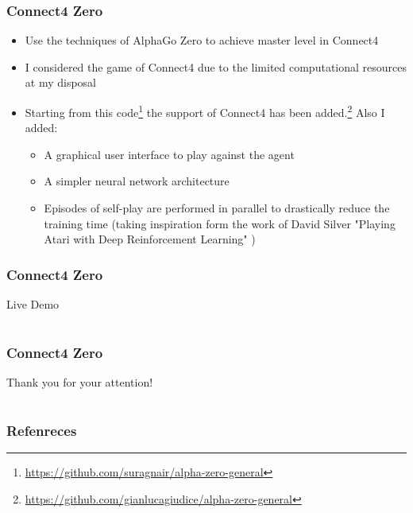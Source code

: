 \documentclass[9pt]{beamer}
\begin{document}
\begin{frame}
	\frametitle{Connect4 Zero}

	\begin{itemize}
		\item Use the techniques of AlphaGo Zero \cite{silver2017mastering} to achieve master level in Connect4
		\item I considered the game of Connect4 due to the limited computational resources at my disposal
		\item Starting from this code\footnote{\url{https://github.com/suragnair/alpha-zero-general}} the support of Connect4 has been added.\footnote{\url{https://github.com/gianlucagiudice/alpha-zero-general}}  Also I added:
		\begin{itemize}
			\item A graphical user interface to play against the agent
			\item A simpler neural network architecture
			\item Episodes of self-play are performed in parallel to drastically reduce the training time (taking inspiration form the work of David Silver "Playing Atari with Deep Reinforcement Learning" \cite{mnih2013atari})

		\end{itemize}

	\end{itemize}

\end{frame}


\begin{frame}
	\frametitle{Connect4 Zero}
	\Huge{\centerline{Live Demo}}
\end{frame}


\section{}
\begin{frame}
	\frametitle{Connect4 Zero}
	\Huge{\centerline{Thank you for your attention!}}
\end{frame}


\section{}
\begin{frame}[allowframebreaks]
	\frametitle{Refenreces}
	\printbibliography
\end{frame}

\end{document}
